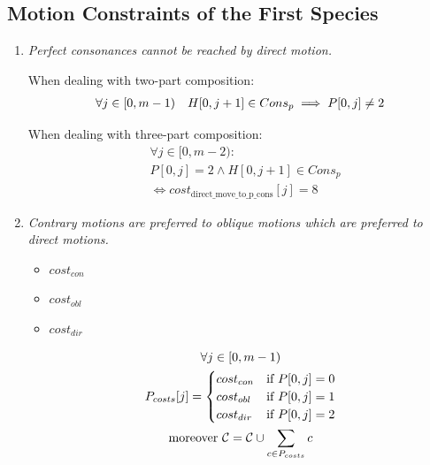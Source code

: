 \subsection*{Motion Constraints of the First Species}
\begin{enumerate}[wide, label=\bfseries 1.P\arabic*]

\item\label{rule:nopconsbydm}{ \textit{Perfect consonances cannot be reached by direct motion.}}

When dealing with two-part composition:
\begin{equation}
    \begin{gathered}
        \forall j \in [0, m-1)\quad
        H[0, j+1] \in Cons_{p} \implies P[0, j] \neq 2
    \end{gathered}
\end{equation}

When dealing with three-part composition:
\begin{equation} \begin{aligned}
  &\forall j \in [0, m-2) :\\
  &P[0, j] = 2 \land H[0, j+1] \in Cons_{p} \\
  &\iff cost_{\text{{direct\_move\_to\_p\_cons}}}[j] = 8
\end{aligned} \end{equation}

\item\label{rule:codmotions} {\textit{Contrary motions are preferred to oblique motions which are preferred to direct motions.}}

\begin{multicols}{3}
    \begin{itemize}
        \item $cost_{con}$\\ 
        \item $cost_{obl}$\\ 
        \item $cost_{dir}$\\ 
    \end{itemize}
\end{multicols}

\begin{equation}
    \begin{gathered}
        \forall j \in [0, m-1)\\
        P_{costs}[j] = \begin{cases}
            cost_{con} & \text{if } P[0, j] = 0\\
            cost_{obl} & \text{if } P[0, j] = 1\\
            cost_{dir} & \text{if } P[0, j] = 2
        \end{cases}\\
        \text{moreover } \mathcal{C} = \mathcal{C} \cup \sum _{c \in P_{costs}} c
    \end{gathered}
\end{equation}


\end{enumerate}
